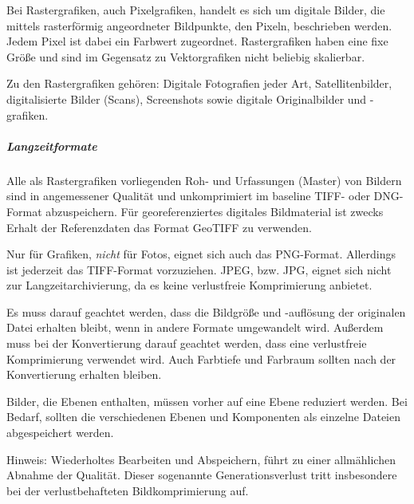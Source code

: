 Bei Rastergrafiken, auch Pixelgrafiken, handelt es sich um digitale Bilder, die mittels rasterförmig angeordneter Bildpunkte, den Pixeln, beschrieben werden. Jedem Pixel ist dabei ein Farbwert zugeordnet. Rastergrafiken haben eine fixe Größe und sind im Gegensatz zu Vektorgrafiken nicht beliebig skalierbar. 

Zu den Rastergrafiken gehören: Digitale Fotografien jeder Art, Satellitenbilder, digitalisierte Bilder (Scans), Screenshots sowie digitale Originalbilder und -grafiken.

\subparagraph{Langzeitformate} Alle als Rastergrafiken vorliegenden Roh- und Urfassungen (Master) von Bildern sind in angemessener Qualität und unkomprimiert im baseline TIFF- oder DNG-Format abzuspeichern. Für georeferenziertes digitales Bildmaterial ist zwecks Erhalt der Referenzdaten das Format GeoTIFF zu verwenden.

Nur für Grafiken, \emph{nicht} für Fotos, eignet sich auch das PNG-Format. Allerdings ist jederzeit das TIFF-Format vorzuziehen. JPEG, bzw. JPG, eignet sich nicht zur Langzeitarchivierung, da es keine verlustfreie Komprimierung anbietet.

Es muss darauf geachtet werden, dass die Bildgröße und -auflösung der originalen Datei erhalten bleibt, wenn in andere Formate umgewandelt wird. Außerdem muss bei der Konvertierung darauf geachtet werden, dass eine verlustfreie Komprimierung verwendet wird. Auch Farbtiefe und Farbraum sollten nach der Konvertierung erhalten bleiben.

Bilder, die Ebenen enthalten, müssen vorher auf eine Ebene reduziert werden. Bei Bedarf, sollten die verschiedenen Ebenen und Komponenten als einzelne Dateien abgespeichert werden. 


Hinweis: Wiederholtes Bearbeiten und Abspeichern, führt zu einer allmählichen Abnahme der Qualität. Dieser sogenannte Generationsverlust tritt insbesondere bei der verlustbehafteten Bildkomprimierung auf.

